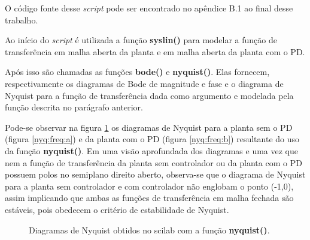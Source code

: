 O código fonte desse \textit{script} pode ser encontrado no apêndice B.1 ao final desse trabalho.

Ao início do \textit{script} é utilizada a função \textbf{syslin()} para modelar a função de transferência em malha aberta da planta e em malha aberta da planta com o PD. 

Após isso são chamadas as funções \textbf{bode()} e \textbf{nyquist()}. Elas fornecem, respectivamente os diagramas de Bode de magnitude e fase e o diagrama de Nyquist para a função de transferência dada como argumento e modelada pela função descrita no parágrafo anterior.

Pode-se observar na figura \ref{nyq:freq} os diagramas de Nyquist para a planta sem o PD (figura \ref{nyq:freq:a}) e da planta com o PD (figura \ref{nyq:freq:b}) resultante do uso da função \textbf{nyquist()}. Em uma visão aprofundada dos diagramas e uma vez que nem a função de transferência da planta sem controlador ou da planta com o PD possuem polos no semiplano direito aberto, observa-se que o diagrama de Nyquist para a planta sem controlador e com controlador não englobam o ponto (-1,0), assim implicando que ambas as funções de transferência em malha fechada são estáveis, pois obedecem o critério de estabilidade de Nyquist.

\begin{figure}[h!]
\begin{center}
\end{center}
\caption{Diagramas de Nyquist obtidos no scilab com a função \textbf{nyquist()}.}
\label{nyq:freq} 
\end{figure}


